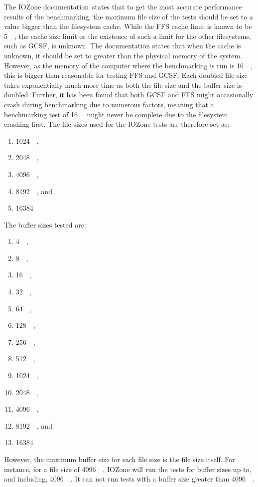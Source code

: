 The IOZone documentation\,\cite{iozoneIozoneFilesystemBenchmark} states that to get the most accurate performance results of the benchmarking, the maximum file size of the tests should be set to a value bigger than the filesystem cache. While the \gls{FFS} cache limit is known to be \SI{5}{\mega\byte}, the cache size limit or the existence of such a limit for the other filesystems, such as \gls{GCSF}, is unknown. The documentation states that when the cache is unknown, it should be set to greater than the physical memory of the system. However, as the memory of the computer where the benchmarking is run is \SI{16}{\giga\byte}, this is bigger than reasonable for testing \gls{FFS} and \gls{GCSF}. Each doubled file size takes exponentially much more time as both the file size and the buffer size is doubled. Further, it has been found that both \gls{GCSF} and \gls{FFS} might occasionally crash during benchmarking due to numerous factors, meaning that a benchmarking test of \SI{16}{\giga\byte} might never be complete due to the filesystem crashing first. The file sizes used for the IOZone tests are therefore set as:
\begin{enumerate}
	\item \SI{1024}{\kilo\byte},
	\item \SI{2048}{\kilo\byte},
	\item \SI{4096}{\kilo\byte},
	\item \SI{8192}{\kilo\byte}, and
	\item \SI{16384}{\kilo\byte}
\end{enumerate}
The buffer sizes tested are:
\begin{enumerate}
	\item \SI{4}{\kilo\byte},
	\item \SI{8}{\kilo\byte},
	\item \SI{16}{\kilo\byte},
	\item \SI{32}{\kilo\byte},
	\item \SI{64}{\kilo\byte},
	\item \SI{128}{\kilo\byte},
	\item \SI{256}{\kilo\byte},
	\item \SI{512}{\kilo\byte},
	\item \SI{1024}{\kilo\byte},
	\item \SI{2048}{\kilo\byte},
	\item \SI{4096}{\kilo\byte},
	\item \SI{8192}{\kilo\byte}, and
	\item \SI{16384}{\kilo\byte}
\end{enumerate}
However, the maximum buffer size for each file size is the file size itself. For instance, for a file size of \SI{4096}{\kilo\byte}, IOZone will run the tests for buffer sizes up to, and including, \SI{4096}{\kilo\byte}. It can not run tests with a buffer size greater than \SI{4096}{\kilo\byte}.

